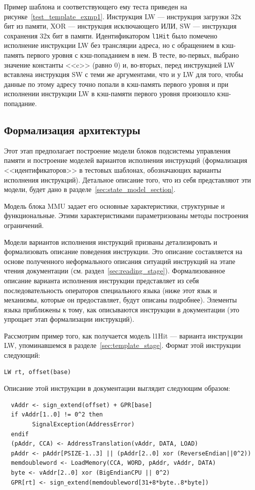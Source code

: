 Пример шаблона и соответствующего ему теста приведен на
рисунке~\ref{test_template_exmp1}. Инструкция LW --- инструкция загрузки 32х бит из памяти, XOR --- инструкция исключающего ИЛИ, SW --- инструкция сохранения 32х бит в памяти. Идентификатором \texttt{l1Hit} было помечено исполнение инструкции LW без трансляции адреса, но с обращением в кэш-память первого уровня с кэш-попаданием в нем. В тесте, во-первых, выбрано значение константы <<c>> (равно 0) и, во-вторых, перед инструкцией LW вставлена инструкция SW с теми же аргументами, что и у LW для того, чтобы данные по этому адресу точно попали в кэш-память первого уровня и при исполнении инструкции LW в кэш-памяти первого уровня произошло кэш-попадание.

\subsection{Формализация архитектуры} 

Этот этап предполагает построение модели блоков подсистемы управления памяти и построение моделей вариантов исполнения инструкций (формализация <<идентификаторов>> в тестовых шаблонах, обозначающих варианты исполнения инструкций). Детальное описание того, что из себя представляют эти модели, будет дано в разделе~\ref{sec:state_model_section}.

Модель блока MMU задает его основные характеристики, структурные и функциональные. Этими характеристиками параметризованы методы построения ограничений.

Модели вариантов исполнения инструкций призваны детализировать и формализовать описание поведения инструкции. Это описание составляется на основе полученного неформального описания ситуаций инструкций на этапе чтения документации (см. раздел~\ref{sec:reading_stage}). Формализованное описание варианта исполнения инструкции представляет из себя последовательность операторов специального языка (ниже этот язык и механизмы, которые он предоставляет, будут описаны подробнее). Элементы языка приближены к тому, как описываются инструкции в документации (это упрощает этап формализации инструкций).

Рассмотрим пример того, как получается модель l1Hit --- варианта инструкции LW, упоминавшемся в разделе~\ref{sec:template_stage}. Формат этой инструкции следующий:
\begin{verbatim}
LW rt, offset(base)
\end{verbatim}

Описание этой инструкции в документации выглядит следующим образом:
\begin{verbatim}
  vAddr <- sign_extend(offset) + GPR[base]
  if vAddr[1..0] != 0^2 then
        SignalException(AddressError)
  endif
  (pAddr, CCA) <- AddressTranslation(vAddr, DATA, LOAD)
  pAddr <- pAddr[PSIZE-1..3] || (pAddr[2..0] xor (ReverseEndian||0^2))
  memdoubleword <- LoadMemory(CCA, WORD, pAddr, vAddr, DATA)
  byte <- vAddr[2..0] xor (BigEndianCPU || 0^2)
  GPR[rt] <- sign_extend(memdoubleword[31+8*byte..8*byte])
\end{verbatim}

